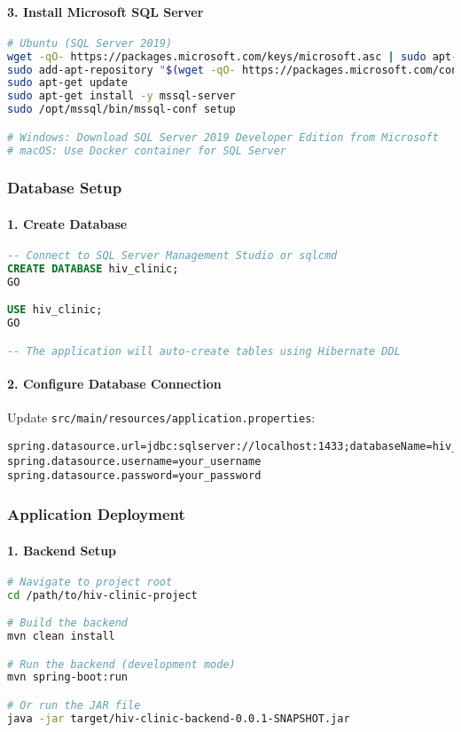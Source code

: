 \documentclass[12pt,a4paper]{article}
\begin{document}
\paragraph{3. Install Microsoft SQL Server}
\begin{lstlisting}[language=bash]
# Ubuntu (SQL Server 2019)
wget -qO- https://packages.microsoft.com/keys/microsoft.asc | sudo apt-key add -
sudo add-apt-repository "$(wget -qO- https://packages.microsoft.com/config/ubuntu/20.04/mssql-server-2019.list)"
sudo apt-get update
sudo apt-get install -y mssql-server
sudo /opt/mssql/bin/mssql-conf setup

# Windows: Download SQL Server 2019 Developer Edition from Microsoft
# macOS: Use Docker container for SQL Server
\end{lstlisting}

\subsubsection{Database Setup}

\paragraph{1. Create Database}
\begin{lstlisting}[language=sql]
-- Connect to SQL Server Management Studio or sqlcmd
CREATE DATABASE hiv_clinic;
GO

USE hiv_clinic;
GO

-- The application will auto-create tables using Hibernate DDL
\end{lstlisting}

\paragraph{2. Configure Database Connection}
Update \texttt{src/main/resources/application.properties}:
\begin{lstlisting}[language=properties]
spring.datasource.url=jdbc:sqlserver://localhost:1433;databaseName=hiv_clinic;encrypt=true;trustServerCertificate=true
spring.datasource.username=your_username
spring.datasource.password=your_password
\end{lstlisting}

\subsubsection{Application Deployment}

\paragraph{1. Backend Setup}
\begin{lstlisting}[language=bash]
# Navigate to project root
cd /path/to/hiv-clinic-project

# Build the backend
mvn clean install

# Run the backend (development mode)
mvn spring-boot:run

# Or run the JAR file
java -jar target/hiv-clinic-backend-0.0.1-SNAPSHOT.jar
\end{lstlisting}
\end{document}
